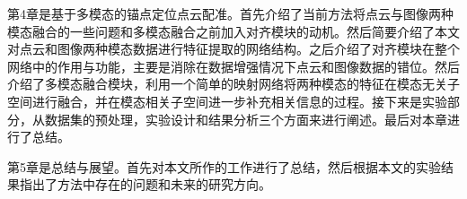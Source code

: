 第4章是基于多模态的锚点定位点云配准。首先介绍了当前方法将点云与图像两种模态融合的一些问题和多模态融合之前加入对齐模块的动机。然后简要介绍了本文对点云和图像两种模态数据进行特征提取的网络结构。之后介绍了对齐模块在整个网络中的作用与功能，主要是消除在数据增强情况下点云和图像数据的错位。然后介绍了多模态融合模块，利用一个简单的映射网络将两种模态的特征在模态无关子空间进行融合，并在模态相关子空间进一步补充相关信息的过程。接下来是实验部分，从数据集的预处理，实验设计和结果分析三个方面来进行阐述。最后对本章进行了总结。

第5章是总结与展望。首先对本文所作的工作进行了总结，然后根据本文的实验结果指出了方法中存在的问题和未来的研究方向。

\clearpage